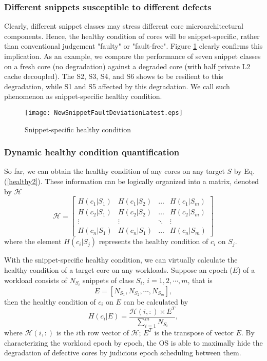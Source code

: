 \subsubsection{Different snippets susceptible to different defects }
Clearly, different snippet classes may stress different core microarchitectural components. Hence, the healthy condition of cores will be snippet-specific, rather than conventional judgement "faulty" or "fault-free". Figure \ref{faultaware} clearly confirms this implication. As an example, we compare the performance of seven snippet classes on a fresh core (no degradation) against a degraded core (with half private L2 cache decoupled). The S2, S3, S4, and S6 shows to be resilient to this degradation, while S1 and S5 affected by this degradation. We call such phenomenon as snippet-specific healthy condition.

\begin{figure}[t]
  \centering
  \texttt{[image: NewSnippetFaultDeviationLatest.eps]}\\
  \caption{Snippet-specific healthy condition}\label{faultaware}
\end{figure}


\subsubsection{Dynamic healthy condition quantification}
So far, we can obtain the healthy condition of any cores on any target $S$ by Eq. (\ref{healthy2}). These information can be logically organized into a matrix, denoted by $\mathcal{H}$
\begin{equation}
\mathcal{H}=\left[
\begin{array}{cccc}
H(c_1|S_1) & H(c_1|S_2) & \ldots & H(c_1|S_m)\\
H(c_2|S_1) & H(c_2|S_2) & \ldots & H(c_2|S_m)\\
\vdots & \vdots & \ddots & \vdots\\
H(c_n|S_1) & H(c_n|S_1) & \ldots & H(c_n|S_m)
\end{array} \right]
\end{equation}
where the element $H(c_i|S_j)$ represents the healthy condition of $c_i$ on $S_j$.

With the snippet-specific healthy condition, we can virtually calculate the healthy condition of a target core on any workloads. Suppose an epoch ($E$) of  a workload consists of $N_{S_i}$ snippets of class $S_i$, $i=1, 2, \cdots, m$, that is
\begin{equation}
E=[N_{S_1}, N_{S_2}, \cdots, N_{S_m}],
\end{equation}
then the healthy condition of  $c_i$ on $E$ can be calculated by
\begin{equation}\label{workloadperf}
  H(c_i|E) = \frac{\mathcal{H}(i, :)\times E^T}{\sum_{i=1}^{m}N_{S_i}},
\end{equation}
where $\mathcal{H}(i, :)$ is the $i$th row vector of $\mathcal{H}$; $E^T$ is the transpose of vector $E$. By characterizing the workload epoch by epoch, the OS is able to maximally hide the degradation of defective cores by judicious epoch scheduling between them. 

